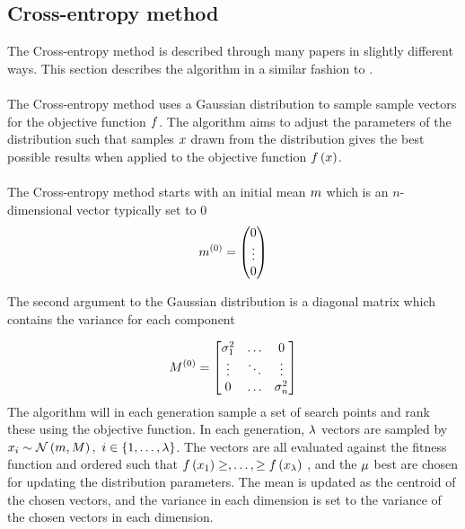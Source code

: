\subsection{Cross-entropy method \label{CrossEntropy}}
The Cross-entropy method is described through many papers in 
slightly different ways. This section
describes the algorithm in a similar fashion 
to \citep{thiery:09}.\\
\\
The Cross-entropy method uses a Gaussian distribution to 
sample sample vectors for the objective function
$f$. The algorithm aims to 
adjust the parameters of the distribution
such that samples $x$ drawn from the distribution
gives the best possible results when applied to the
objective function $f \left( x \right)$.\\
\\
The Cross-entropy method starts with an initial 
mean $m$ which is an $n$-dimensional vector
typically set to 0
\begin{align}
m^{(0)} = \begin{pmatrix}
0\\
\vdots\\
0
\end{pmatrix} 
\end{align}

The second argument to the Gaussian distribution is a 
diagonal matrix which contains the variance for each 
component

\begin{align}
M^{(0)} =
\begin{bmatrix}
\sigma_1^{2} & \hdots & 0\\
\vdots & \ddots & \vdots\\
0 & \hdots & \sigma_{n}^{2}
\end{bmatrix}
\end{align}
The algorithm will in each generation sample a set of search points
and rank these using the objective function.
In each generation, $\lambda$ vectors are sampled by 
$x_{i} \sim \mathcal{N} \left(m, M \right)
,\ i \in \{1,\dots,\lambda \}$. The vectors are all evaluated 
against the fitness function and ordered such that $f \left( x_{1} \right) \geq, \dots, \geq f \left( x_{\lambda} \right)$
, and the $\mu$ best are chosen for updating the distribution 
parameters. The mean is updated as the centroid of the chosen vectors, and
the variance in each dimension is set to the variance of the chosen vectors in each 
dimension.\\

